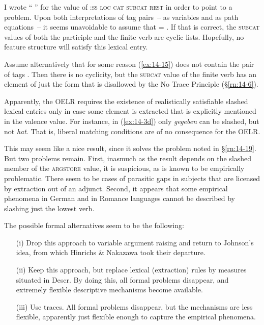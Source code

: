 \documentclass[output=paper]{LSP/langsci}
\begin{document}
I wrote `` '' for the value of \textsc{:ss loc cat subcat rest} in order to point to a problem. Upon both interpretations of tag pairs~-- as variables and as path equations~-- it seems unavoidable to assume that  = . If that is correct, the \textsc{subcat} values of both the participle and the finite verb are cyclic lists. Hopefully, no feature structure will satisfy this lexical entry.

\randnum\label{rn:14-24}
Assume alternatively that for some reason (\ref{ex:14-15}) does not contain the pair of tags . Then there is no cyclicity, but the \textsc{subcat} value of the finite verb has an element of just the form that is disallowed by the No Trace Principle (§\ref{rn:14-6}).

\randnum\label{rn:14-25}
Apparently, the OELR requires the existence of realistically satisfiable slashed lexical entries only in case some element is extracted that is explicitly mentioned in the valence value. For instance, in (\ref{ex:14-3d}) only \textit{gegeben} can be slashed, but not \textit{hat}. That is,  liberal matching conditions are of no consequence for the OELR.

\randnum\label{rn:14-26}
This may seem like a nice result, since it solves the problem noted in §\ref{rn:14-19}. But two problems remain. First, inasmuch as the result depends on the slashed member of the \textsc{argstore} value, it is suspicious, as   is known to be empirically problematic. There seem to be cases of parasitic gaps in subjects that are licensed by extraction out of an adjunct. Second, it appears that some empirical phenomena in German and in Romance languages cannot be described by slashing just the lowest verb.

\randnum\label{rn:14-27}
The possible formal alternatives seem to be the following:
\begin{enumerate}
\item[(i)] Drop this approach to variable argument raising and return to Johnson's idea, from which Hinrichs \& Nakazawa took their departure.
\item[(ii)] Keep this approach, but replace lexical (extraction) rules by measures situated in \textsf{Descr}. By doing this, all formal problems disappear, and extremely flexible descriptive mechanisms become available.
\item[(iii)] Use traces. All formal problems disappear, but the mechanisms are less flexible, apparently just flexible enough to capture the empirical phenomena.
\end{enumerate}

\nocite{King89}
\nocite{King94}
\nocite{Johnson83}

\printbibliography[heading=subbibliography,notkeyword=this]
\label{chap-celr-end}
\end{document}
